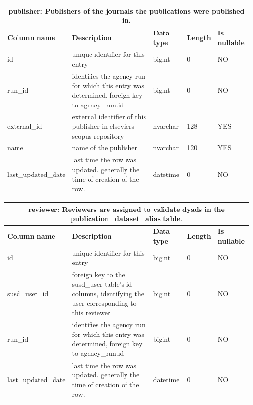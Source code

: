 \documentclass[titlepage, 11pt]{article}
\begin{document}
{\begin{table}[h!]
{\renewcommand{\arraystretch}{1.5}%
\begin{tabularx}{1\textwidth} {|p{4cm}|p{5.33cm}|p{2cm}|p{1.5cm}|p{1.5cm}|}
 \hline
 \multicolumn{5}{|c|}{\textbf{publisher: Publishers of the journals the publications were published in.}}\\
 \hline
 \textbf{Column name} & \textbf{Description} & \textbf{Data type} & \textbf{Length} & \textbf{Is nullable} \\
 \hline
 id & unique identifier for this entry & bigint   & 0   & NO  \\
 \hline
 run\_id & identifies the agency run for which this entry was determined, foreign key to agency\_run.id & bigint   & 0   & NO  \\
 \hline
 external\_id & external identifier of this publisher in elseviers scopus repository & nvarchar & 128 & YES \\
 \hline
 name & name of the publisher  & nvarchar & 120 & YES \\
 \hline
 last\_updated\_date & last time the row was updated. generally the time of creation of the row.  & datetime & 0   & NO \\
\hline

\end{tabularx}
\label{table: appendix b - publisher}
}
\end{table}


\begin{table}[h!]

{\renewcommand{\arraystretch}{1.5}%
\begin{tabularx}{1\textwidth} {|p{4cm}|p{5.33cm}|p{2cm}|p{1.5cm}|p{1.5cm}|}
 \hline
 \multicolumn{5}{|c|}{\textbf{reviewer: Reviewers are  assigned to validate dyads in the publication\_dataset\_alias table.}}\\
 \hline
 \textbf{Column name} & \textbf{Description} & \textbf{Data type} & \textbf{Length} & \textbf{Is nullable} \\
 \hline
 id & unique identifier for this entry & bigint   & 0 & NO \\
 \hline
 susd\_user\_id & foreign key to the susd\_user table's id columns, identifying the user corresponding to this reviewer & bigint & 0 & NO \\
 \hline
 run\_id & identifies the agency run for which this entry was determined, foreign key to agency\_run.id & bigint   & 0 & NO \\
 \hline
last\_updated\_date & last time the row was updated. generally the time of creation of the row. & datetime & 0 & NO \\
\hline


\end{tabularx}}
\end{table}}
\end{document}
